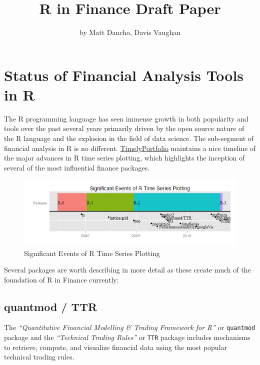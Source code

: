 \title{R in Finance Draft Paper}
\author{by Matt Dancho, Davis Vaughan}

\maketitle


\section{Status of Financial Analysis Tools in
R}\label{status-of-financial-analysis-tools-in-r}

The R programming language has seen immense growth in both popularity
and tools over the past several years primarily driven by the open
source nature of the R language and the explosion in the field of data
science. The sub-segment of financial analysis in R is no different.
\href{https://timelyportfolio.github.io/rCharts_time_series/history.html}{TimelyPortfolio}
maintains a nice timeline of the major advances in R time series
plotting, which highlights the inception of several of the most
influential finance packages.

\begin{figure}[htbp]
  \centering
  \includegraphics[width=14cm]{timeline}
  \caption{Significant Events of R Time Series Plotting}
  \label{figure:timeline}
\end{figure}

Several packages are worth describing in more detail as these create
much of the foundation of R in Finance currently:

\subsection{quantmod / TTR}\label{quantmod-ttr}

The \emph{``Quantitative Financial Modelling \& Trading Framework for
R''} or \texttt{quantmod} package and the \emph{``Technical Trading
Rules''} or \texttt{TTR} package includes mechanisms to retrieve,
compute, and visualize financial data using the most popular technical
trading rules.

